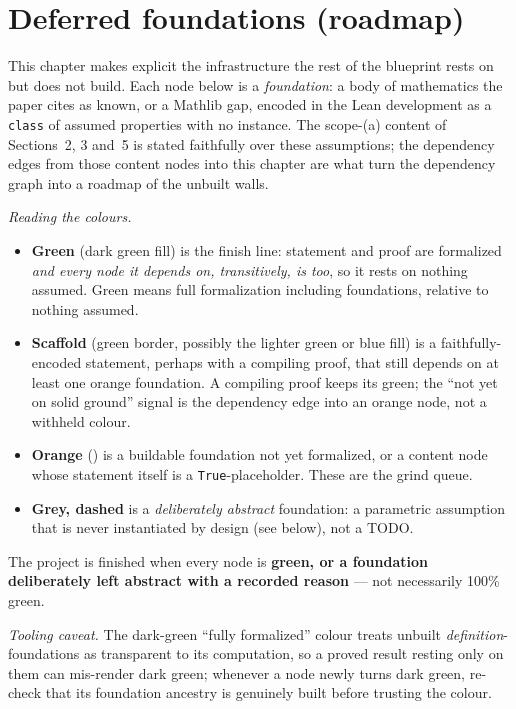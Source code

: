 \chapter{Deferred foundations (roadmap)}

This chapter makes explicit the infrastructure the rest of the blueprint rests on but
does not build. Each node below is a \emph{foundation}: a body of mathematics the paper
cites as known, or a Mathlib gap, encoded in the Lean development as a \texttt{class} of
assumed properties with no instance. The scope-(a) content of Sections~2, 3 and~5 is
stated faithfully over these assumptions; the dependency edges from those content nodes
into this chapter are what turn the dependency graph into a roadmap of the unbuilt walls.

\emph{Reading the colours.}
\begin{itemize}
  \item \textbf{Green} (dark green fill) is the finish line: statement and proof are
    formalized \emph{and every node it depends on, transitively, is too}, so it rests on
    nothing assumed. Green means full formalization including foundations, relative to
    nothing assumed.
  \item \textbf{Scaffold} (green border, possibly the lighter green or blue fill) is a
    faithfully-encoded statement, perhaps with a compiling proof, that still depends on at
    least one orange foundation. A compiling proof keeps its green; the ``not yet on solid
    ground'' signal is the dependency edge into an orange node, not a withheld colour.
  \item \textbf{Orange} (\notready) is a buildable foundation not yet formalized, or a
    content node whose statement itself is a \texttt{True}-placeholder. These are the
    grind queue.
  \item \textbf{Grey, dashed} is a \emph{deliberately abstract} foundation: a parametric
    assumption that is never instantiated by design (see below), not a TODO.
\end{itemize}
The project is finished when every node is \textbf{green, or a foundation deliberately
left abstract with a recorded reason} --- not necessarily 100\% green.

\emph{Tooling caveat.} The dark-green ``fully formalized'' colour treats unbuilt
\emph{definition}-foundations as transparent to its computation, so a proved result
resting only on them can mis-render dark green; whenever a node newly turns dark green,
re-check that its foundation ancestry is genuinely built before trusting the colour.


